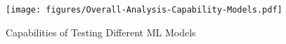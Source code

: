 \documentclass[preprint,1p,authoryear,times]{elsarticle}
\begin{document}

\begin{figure}[h]
	\centering
	\texttt{[image: figures/Overall-Analysis-Capability-Models.pdf]}
	\caption{Capabilities of Testing Different ML Models}
	\label{fig:CaseStudyCapability}
\end{figure}
\end{document}
